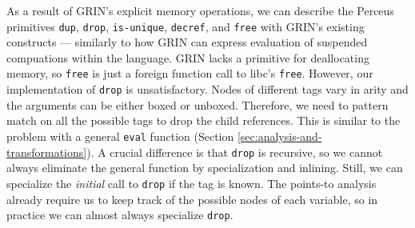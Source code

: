 \documentclass[9pt, twocolumn]{article}
\begin{document}
%

As a result of GRIN's explicit memory operations, we can describe the Perceus primitives \lstinline{dup}, \lstinline{drop}, \lstinline{is-unique}, \lstinline{decref}, and \lstinline{free} with GRIN's existing constructs --- similarly to how GRIN can express evaluation of suspended compuations within the language.
GRIN lacks a primitive for deallocating memory, so \lstinline{free} is just a foreign function call to libc's \lstinline{free}. 
However, our implementation of \lstinline{drop} is unsatisfactory. 
Nodes of different tags vary in arity and the arguments can be either boxed or unboxed.
Therefore, we need to pattern match on all the possible tags to drop the child references. 
This is similar to the problem with a general \lstinline{eval} function (Section \ref{sec:analysis-and-transformations}). 
A crucial difference is that \lstinline{drop} is recursive, so we cannot always eliminate the general function by specialization and inlining.
Still, we can specialize the \emph{initial} call to \lstinline{drop} if the tag is known. 
The points-to analysis already require us to keep track of the possible nodes of each variable, so in practice we can almost always specialize \lstinline{drop}.
\end{document}
